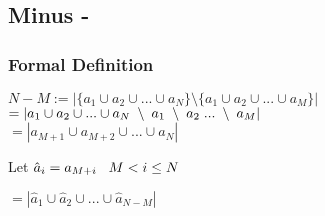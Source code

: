 \documentclass[11pt]{article}
\begin{document}
\subsection{Minus -}
\subsubsection{Formal Definition}
\begin{center}
\vspace{1mm}
$
N - M := |\{a_1 \cup a_2 \cup ... \cup a_N\} \setminus \{a_1 \cup a_2 \cup ... \cup a_M\}|
$
\\ \vspace{2mm}
$
= | a_1 \cup a_2 \cup ... \cup a_N \hspace{1mm} \setminus \hspace{1mm} a_1 \hspace{1mm} \setminus \hspace{1mm} a_2 \hspace{1mm} ...\hspace{1mm} \setminus \hspace{1mm} a_M |
$
\\ \vspace{2mm}
$
= | a_{M+1} \cup a_{M+2} \cup ... \cup a_N |
$
\end{center}
Let $\hat{a}_i = a_{M+i} \hspace{3mm} M < i \leq N$
\begin{center}
$
= | \hat{a}_{1} \cup \hat{a}_{2} \cup ... \cup \hat{a}_{N-M}|
$
\end{center}
\end{document}
